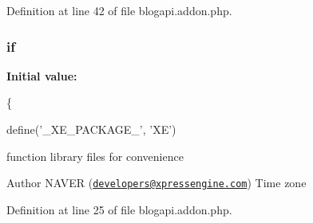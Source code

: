 Definition at line 42 of file blogapi.\+addon.\+php.

\hypertarget{blogapi_8addon_8php_ae00067f6d78515f89a86a2a7f42cdc80}{
\subsubsection[{if}]{\setlength{\rightskip}{0pt plus 5cm}if}}\label{blogapi_8addon_8php_ae00067f6d78515f89a86a2a7f42cdc80}
{\bfseries Initial value\+:}
\begin{DoxyCode}
\{
    
    define(\textcolor{stringliteral}{'\_XE\_PACKAGE\_'}, \textcolor{stringliteral}{'XE'})
\end{DoxyCode}
function library files for convenience

\begin{DoxyAuthor}{Author}
N\+A\+V\+E\+R (\href{mailto:developers@xpressengine.com}{\tt developers@xpressengine.\+com}) Time zone 
\end{DoxyAuthor}


Definition at line 25 of file blogapi.\+addon.\+php.

